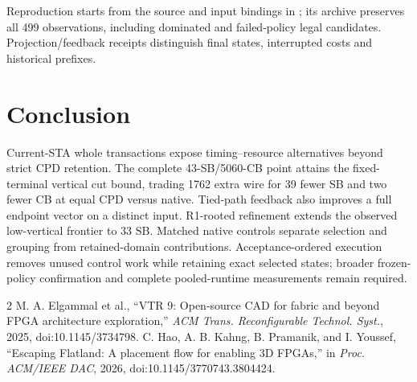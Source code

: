 \documentclass[conference,10pt]{IEEEtran}
\begin{document}
Reproduction starts from the source and input bindings in ; its archive preserves all 499 observations, including dominated and failed-policy legal candidates. Projection/feedback receipts distinguish final states, interrupted costs and historical prefixes.

\section{Conclusion}
Current-STA whole transactions expose timing--resource alternatives beyond strict CPD retention. The complete 43-SB/5060-CB point attains the fixed-terminal vertical cut bound, trading 1762 extra wire for 39 fewer SB and two fewer CB at equal CPD versus native. Tied-path feedback also improves a full endpoint vector on a distinct input. R1-rooted refinement extends the observed low-vertical frontier to 33 SB. Matched native controls separate selection and grouping from retained-domain contributions. Acceptance-ordered execution removes unused control work while retaining exact selected states; broader frozen-policy confirmation and complete pooled-runtime measurements remain required.

\begin{thebibliography}{2}
 M. A. Elgammal et al., ``VTR 9: Open-source CAD for fabric and beyond FPGA architecture exploration,'' \emph{ACM Trans. Reconfigurable Technol. Syst.}, 2025, doi:10.1145/3734798.
 C. Hao, A. B. Kahng, B. Pramanik, and I. Youssef, ``Escaping Flatland: A placement flow for enabling 3D FPGAs,'' in \emph{Proc. ACM/IEEE DAC}, 2026, doi:10.1145/3770743.3804424.
\end{thebibliography}
\end{document}
